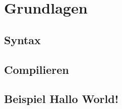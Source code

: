 \section{Grundlagen}
\subsection{Syntax}
\subsection{Compilieren}
\subsection{Beispiel \glqq Hallo World!\grqq}